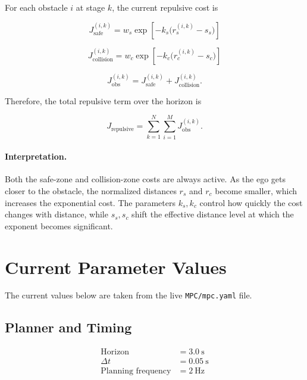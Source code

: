 \documentclass[11pt]{article}
\begin{document}
For each obstacle $i$ at stage $k$, the current repulsive cost is

\begin{equation}
J_{\mathrm{safe}}^{(i,k)}
=
w_s \exp\!\left[-k_s\big(r_s^{(i,k)}-s_s\big)\right]
\end{equation}

\begin{equation}
J_{\mathrm{collision}}^{(i,k)}
=
w_c \exp\!\left[-k_c\big(r_c^{(i,k)}-s_c\big)\right]
\end{equation}

\begin{equation}
J_{\mathrm{obs}}^{(i,k)}
=
J_{\mathrm{safe}}^{(i,k)}
+
J_{\mathrm{collision}}^{(i,k)}.
\end{equation}

Therefore, the total repulsive term over the horizon is

\begin{equation}
J_{\mathrm{repulsive}}
=
\sum_{k=1}^{N}\sum_{i=1}^{M} J_{\mathrm{obs}}^{(i,k)}.
\end{equation}

\paragraph{Interpretation.}
Both the safe-zone and collision-zone costs are always active. As the ego gets
closer to the obstacle, the normalized distances $r_s$ and $r_c$ become smaller,
which increases the exponential cost. The parameters $k_s,k_c$ control how
quickly the cost changes with distance, while $s_s,s_c$ shift the effective
distance level at which the exponent becomes significant.

\section{Current Parameter Values}

The current values below are taken from the live \texttt{MPC/mpc.yaml} file.

\subsection{Planner and Timing}

\begin{align}
\text{Horizon} &= 3.0~\mathrm{s} \\
\Delta t &= 0.05~\mathrm{s} \\
\text{Planning frequency} &= 2~\mathrm{Hz}
\end{align}
\end{document}
